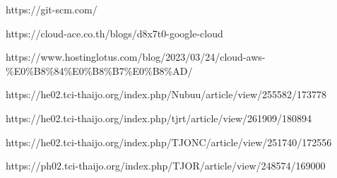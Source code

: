\begin{thebibliography}{99}
    https://git-scm.com/

    https://cloud-ace.co.th/blogs/d8x7t0-google-cloud

    https://www.hostinglotus.com/blog/2023/03/24/cloud-aws-\%E0\%B8\%84\%E0\%B8\%B7\%E0\%B8\%AD/

    https://he02.tci-thaijo.org/index.php/Nubuu/article/view/255582/173778

    https://he02.tci-thaijo.org/index.php/tjrt/article/view/261909/180894   

    https://he02.tci-thaijo.org/index.php/TJONC/article/view/251740/172556

    https://ph02.tci-thaijo.org/index.php/TJOR/article/view/248574/169000



\end{thebibliography}